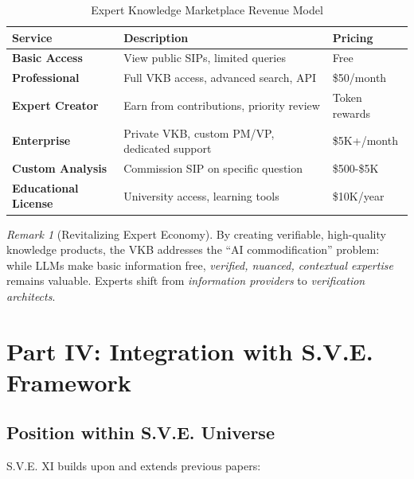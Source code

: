 \documentclass[11pt,a4paper]{article}
\theoremstyle{definition}
\theoremstyle{remark}
\newtheorem{remark}{Remark}[section]
\newcommand{\VKB}{\textsc{VKB}}
\newcommand{\SIP}{\textsc{SIP}}
\begin{document}
\begin{table}[H]
\centering
\caption{Expert Knowledge Marketplace Revenue Model}
\begin{tabular}{@{}lp{5cm}p{3cm}@{}}
\toprule
\textbf{Service} & \textbf{Description} & \textbf{Pricing} \\
\midrule
\textbf{Basic Access} & View public \SIP{}s, limited queries & Free \\
\textbf{Professional} & Full \VKB{} access, advanced search, API & \$50/month \\
\textbf{Expert Creator} & Earn from contributions, priority review & Token rewards \\
\textbf{Enterprise} & Private \VKB{}, custom PM/VP, dedicated support & \$5K+/month \\
\textbf{Custom Analysis} & Commission \SIP{} on specific question & \$500-\$5K \\
\textbf{Educational License} & University access, learning tools & \$10K/year \\
\bottomrule
\end{tabular}
\end{table}

\begin{remark}[Revitalizing Expert Economy]
By creating verifiable, high-quality knowledge products, the \VKB{} addresses the ``AI commodification'' problem: while LLMs make basic information free, \textit{verified, nuanced, contextual expertise} remains valuable. Experts shift from \textit{information providers} to \textit{verification architects}.
\end{remark}

\section{Part IV: Integration with S.V.E. Framework}

\subsection{Position within S.V.E. Universe}

S.V.E. XI builds upon and extends previous papers:
\end{document}
